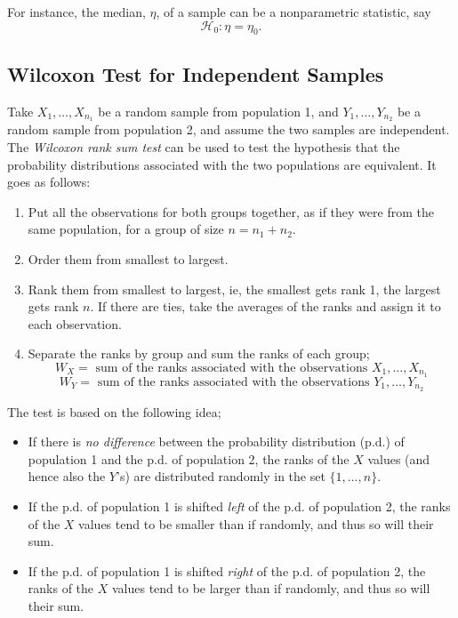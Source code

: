 \documentclass[12pt]{article}
\begin{document}
For instance, the median, $\eta$, of a sample can be a nonparametric statistic, say \[\mathcal{H}_0: \eta = \eta_0.\]

\subsection{Wilcoxon Test for Independent Samples}

Take $X_1, \dots, X_{n_1}$ be a random sample from population 1, and $Y_1, \dots, Y_{n_2}$ be a random sample from population 2, and assume the two samples are independent. The \textit{Wilcoxon rank sum test} can be used to test the hypothesis that the probability distributions associated with the two populations are equivalent. It goes as follows:

\begin{enumerate}
    \item Put all the observations for both groups together, as if they were from the same population, for a group of size $n = n_1 + n_2$.
    \item Order them from smallest to largest.
    \item Rank them from smallest to largest, ie, the smallest gets rank 1, the largest gets rank $n$. If there are ties, take the averages of the ranks and assign it to each observation.
    \item Separate the ranks by group and sum the ranks of each group;
    \[W_X = \text{ sum of the ranks associated with the observations } X_1, \dots, X_{n_1}\]
    \[W_Y = \text{ sum of the ranks associated with the observations } Y_1, \dots, Y_{n_2}\]
\end{enumerate}

The test is based on the following idea;
\begin{itemize}
    \item If there is \textit{no difference} between the probability distribution (p.d.) of population 1 and the p.d. of population 2, the ranks of the $X$ values (and hence also the $Y$'s) are distributed randomly in the set $\{1, \dots, n\}$.
    \item If the p.d. of population 1 is shifted \textit{left} of the p.d. of population 2, the ranks of the $X$ values tend to be smaller than if randomly, and thus so will their sum.
    \item If the p.d. of population 1 is shifted \textit{right} of the p.d. of population 2, the ranks of the $X$ values tend to be larger than if randomly, and thus so will their sum.
\end{itemize}
\end{document}
